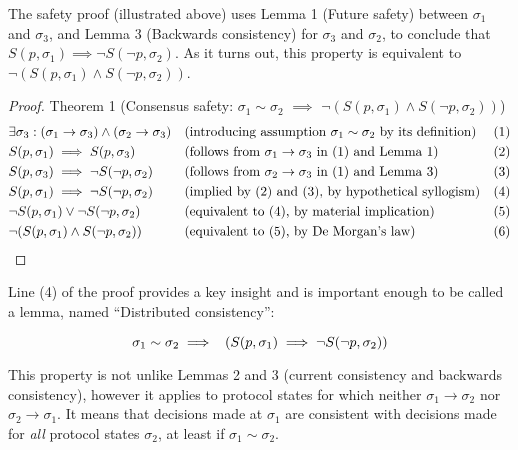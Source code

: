 \documentclass{article}
\theoremstyle{definition}
\begin{document}
The safety proof (illustrated above) uses Lemma 1 (Future safety) between $\sigma_1$ and $\sigma_3$, and Lemma 3 (Backwards consistency) for $\sigma_3$ and $\sigma_2$, to conclude that $S(p,\sigma_1) \implies \neg{S(\neg{p},\sigma_2)}$. As it turns out, this property is equivalent to $\neg{(S(p,\sigma_1)\land S(\neg{p},\sigma_2))}$.


\begin{proof}
Theorem 1 (Consensus safety: $\sigma_1 \sim \sigma_2$ $\implies$ $\neg(S(p,\sigma_1) \land S(\neg{p},\sigma_2))$)
\begin{align*}
  &\exists \sigma_3:(\sigma_1 \to \sigma_3) \land (\sigma_2 \to \sigma_3) &&\text{(introducing assumption $\sigma_1 \sim \sigma_2$ by its definition)} &&\text{(1)} \\
  &S(p,\sigma_1) \implies S(p,\sigma_3) &&\text{(follows from $\sigma_1 \to \sigma_3$ in (1) and Lemma 1)} &&\text{(2)} \\
  &S(p,\sigma_3) \implies \neg{S(\neg{p},\sigma_2)} &&\text{(follows from $\sigma_2 \to \sigma_3$ in (1) and Lemma 3)} &&\text{(3)} \\
  &S(p,\sigma_1) \implies \neg{S(\neg{p},\sigma_2)} &&\text{(implied by (2) and (3), by hypothetical syllogism)} &&\text{(4)} \\
  &\neg{S(p,\sigma_1)} \lor \neg{S(\neg{p},\sigma_2)} &&\text{(equivalent to (4), by material implication)} &&\text{(5)} \\
  &\neg(S(p,\sigma_1) \land S(\neg{p},\sigma_2)) \hspace{5mm} \qedhere &&\text{(equivalent to (5), by De Morgan's law)}&&\text{(6)}
\end{align*}
\end{proof}

Line (4) of the proof provides a key insight and is important enough to be called a lemma, named ``Distributed consistency'':

\begin{lemma}
$$
\sigma_1 \sim \sigma_2 \implies \hspace{2mm} (S(p,\sigma_1) \implies \neg{S(\neg{p},\sigma_2)})
$$
\end{lemma}

This property is not unlike Lemmas 2 and 3 (current consistency and backwards consistency), however it applies to protocol states for which neither $\sigma_1 \to \sigma_2$ nor $\sigma_2 \to \sigma_1$. It means that decisions made at $\sigma_1$ are consistent with decisions made for \emph{all} protocol states $\sigma_2$, at least if $\sigma_1 \sim \sigma_2$.
\end{document}
